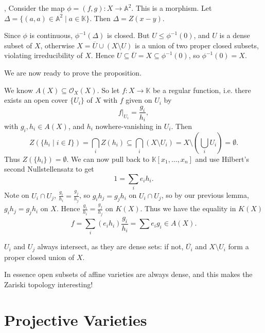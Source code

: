 \documentclass[12pt]{article}
\begin{document}
\begin{proofbox},
	Consider the map $\phi = (f, g) : X \to \mathbb{A}^2$. This is a morphism. Let $\Delta = \{(a, a) \in \mathbb{A}^2 \mid a \in \mathbb{K}\}$. Then $\Delta = Z(x - y)$.

	Since $\phi$ is continuous, $\phi^{-1}(\Delta)$ is closed. But $U \leq \phi^{-1}(0)$, and $U$ is a dense subset of $X$, otherwise $X = \overline{U} \cup (X \setminus U)$ is a union of two proper closed subsets, violating irreducibility of $X$. Hence $U \subseteq \overline{U} = X \subseteq \phi^{-1}(0)$, so $\phi^{-1}(0) = X$.
\end{proofbox}

We are now ready to prove the proposition.

\begin{proofbox}
	We know $A(X) \subseteq \mathcal{O}_X(X)$. So let $f : X \to \mathbb{K}$ be a regular function, i.e. there exists an open cover $\{U_i\}$ of $X$ with $f$ given on $U_i$ by
	\[
	f|_{U_i} = \frac{g_i}{h_i},
	\]
	with $g_i, h_i \in A(X)$, and $h_i$ nowhere-vanishing in $U_i$. Then
	\[
		Z(\{h_i \mid i \in I\}) = \bigcap_i Z(h_i) \subseteq \bigcap_i \left( X \setminus U_i \right) = X \setminus \left( \bigcup_i U_i \right) = \emptyset.
	\]
	Thus $Z(\{h_i\}) = \emptyset$. We can now pull back to $\mathbb{K}[x_1, \ldots, x_n]$ and use Hilbert's second Nullstellensatz to get
	\[
	1 = \sum_i e_i h_i.
	\]
	Note on $U_i \cap U_j$, $\frac{g_i}{h_i} = \frac{g_j}{h_j}$, so $g_i h_j = g_j h_i$ on $U_i \cap U_j$, so by our previous lemma, $g_i h_j = g_j h_i$ on $X$. Hence $\frac{g_i}{h_i} = \frac{g_j}{h_j}$ on $K(X)$. Thus we have the equality in $K(X)$ 
	\[
	f = \sum_i (e_i h_i) \frac{g_i}{h_i} = \sum e_i g_i \in A(X).
	\]
\end{proofbox}

\begin{remark}
	$U_i$ and $U_j$ always intersect, as they are dense sets: if not, $\overline{U_i}$ and $X \setminus U_i$ form a proper closed union of $X$.

	In essence open subsets of affine varieties are always dense, and this makes the Zariski topology interesting!
\end{remark}


\newpage

\section{Projective Varieties}
\label{sec:proj_var}

\end{document}
